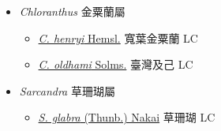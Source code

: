 
  \begin{itemize}
 \item[] \textit{Chloranthus} 金粟蘭屬
                                
  \begin{itemize}
        \item[] \href{http://www.theplantlist.org/tpl1.1/search?q=Chloranthus+henryi}{\textit{C. henryi} Hemsl.}   寬葉金粟蘭   LC
        \item[] \href{http://www.theplantlist.org/tpl1.1/search?q=Chloranthus+oldhami}{\textit{C. oldhami} Solms.}   臺灣及己   LC
  \end{itemize}
 \item[] \textit{Sarcandra} 草珊瑚屬
                                
  \begin{itemize}
        \item[] \href{http://www.theplantlist.org/tpl1.1/search?q=Sarcandra+glabra}{\textit{S. glabra} (Thunb.) Nakai}   草珊瑚   LC
  \end{itemize}
  \end{itemize}

